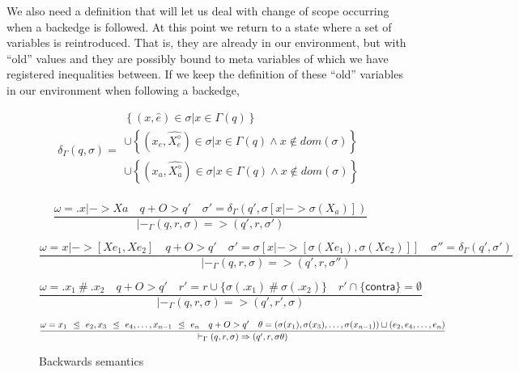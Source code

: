 \documentclass[10pt]{../sigplanconf}
\newcommand{\gen}{\ensuremath{~{\leq\kern-6pt \raisebox{1pt}{$\cdot$}}~}}
\begin{document}
We also need a definition that will let us deal with change of scope
occurring when a backedge is followed. At this point we return to a
state where a set of variables is reintroduced. That is, they are
already in our environment, but with ``old'' values and they are
possibly bound to meta variables of which we have registered
inequalities between. If we keep the definition of these ``old''
variables in our environment when following a backedge, 


\begin{equation}
  \label{eq:delta}
  \delta_\Gamma(q, \sigma) =
  \begin{array}{l}
    \left\{ (x, \widehat{e}) \in \sigma | x \in \Gamma(q) \right\} \\
    \cup
    \left\{ (x_e, \widehat{X_e^\diamond}) \in \sigma \Big| x \in \Gamma(q) \land x \not \in dom(\sigma) \right\} \\
    \cup \left\{ (x_a, \widehat{X_a^\diamond}) \in \sigma \Big| x \in \Gamma(q) \land x \not \in dom(\sigma) \right\} \\
  \end{array}
\end{equation}

\begin{figure*}
  \centering
  \begin{equation*}
    \frac{
      \omega = \texttt{.}x |-> Xa
      \quad q +O> q'
      \quad \sigma' = \delta_\Gamma(q', \sigma[x |-> \sigma(X_a)])
    }
    {
      |-_\Gamma (q, r, \sigma) => (q', r, \sigma')
    }
  \end{equation*}

  \begin{equation*}
    \frac{
      \omega = x |-> [Xe_1, Xe_2]
      \quad q +O> q'
      \quad \sigma' = \sigma[x |-> [\sigma(Xe_1), \sigma(Xe_2)]]
      \quad \sigma'' = \delta_\Gamma(q', \sigma')
    }
    {
      |-_\Gamma (q, r, \sigma) => (q', r, \sigma'')
    }
  \end{equation*}

  \begin{equation*}
    \frac{
      \omega = \texttt{.}x_1\ \#\ \texttt{.}x_2
      \quad q +O> q'
      \quad r' = r \cup \{ \sigma(\texttt{.}x_1)\ \#\ \sigma(\texttt{.}x_2) \}
      \quad r' \cap \{\textsf{contra}\} = \emptyset
    }
    {
      |-_\Gamma (q, r, \sigma) => (q', r', \sigma)
    }
  \end{equation*}

  \begin{equation*}
    \frac{
      \omega = x_1\ \gen\ e_2, x_3\ \gen\ e_4, \ldots, x_{n-1}\ \gen\ e_n
      \quad q +O> q'
      \quad \theta = (\sigma(x_1), \sigma(x_3), \ldots, \sigma(x_{n-1})) 
             \sqcup (e_2, e_4, \ldots, e_{n})
    }
    {
      |-_\Gamma (q, r, \sigma) => (q', r, \sigma\theta)
    }
  \end{equation*}
  \caption{Backwards semantics}
  \label{fig:delta}
\end{figure*}
\end{document}
